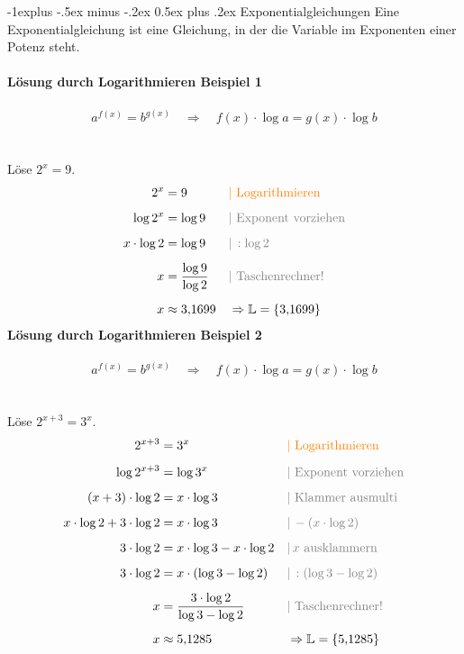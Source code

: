 \documentclass[10pt,landscape]{article}
\makeatletter
\renewcommand{\subsection}{\@startsection{subsection}{2}{0mm}%
                                {-1explus -.5ex minus -.2ex}%
                                {0.5ex plus .2ex}%
                                {\normalfont\normalsize\bfseries}}
\makeatother
\begin{document}
\begin{multicols}{3}
    \subsection{Exponential­gleichungen}
    Eine Exponentialgleichung ist eine Gleichung, in der die Variable im Exponenten einer Potenz steht. \\~\\
    \textbf{Lösung durch Logarithmieren Beispiel 1}\\~\\
    \[a^{f(x)} = b^{g(x)} \quad \Rightarrow \quad f(x) \cdot \log a = g(x) \cdot \log b\]\\~\\
    Löse $2^x = 9$.\\
    \begin{align*} 2^x &= 9 &&{\color{orange}| \text{ Logarithmieren}} \\[5px] \log 2^x &= \log 9 &&{\color{gray}| \text{ Exponent vorziehen}} \\[5px] x \cdot \log 2 &= \log 9 &&{\color{gray}|\, :\log 2} \\[5px] x &= \frac{\log 9}{\log 2} &&{\color{gray}| \text{ Taschenrechner!}} \\[5px] x &\approx 3{,}1699 && \Rightarrow \mathbb{L} = \{3{,}1699\} \end{align*}
    \textbf{Lösung durch Logarithmieren Beispiel 2}\\~\\
    \[a^{f(x)} = b^{g(x)} \quad \Rightarrow \quad f(x) \cdot \log a = g(x) \cdot \log b\]\\~\\
    Löse $2^{x+3} = 3^x$. \\
    \begin{align*} 2^{x+3} &= 3^x &&{\color{orange}| \text{ Logarithmieren}} \\[5px] \log 2^{x+3} &= \log 3^x &&{\color{gray}| \text{ Exponent vorziehen}} \\[5px] (x+3) \cdot \log 2 &= x \cdot \log 3 &&{\color{gray}| \text{ Klammer ausmulti}} \\[5px] x \cdot \log 2 + 3 \cdot \log 2 &= x \cdot \log 3 &&{\color{gray}|\, -(x \cdot \log 2)} \\[5px] 3 \cdot \log 2 &= x \cdot \log 3 - x \cdot \log 2 &&{\color{gray}|\, x \text{ ausklammern}} \\[5px] 3 \cdot \log 2 &= x \cdot (\log 3 - \log 2) &&{\color{gray}|\, : (\log 3 - \log 2)} \\[5px] x &= \frac{3 \cdot \log 2}{\log 3 - \log 2} &&{\color{gray}| \text{ Taschenrechner!}} \\[5px] x &\approx 5{,}1285 && \Rightarrow \mathbb{L} = \{5{,}1285\} \end{align*}

\end{multicols}
\end{document}
